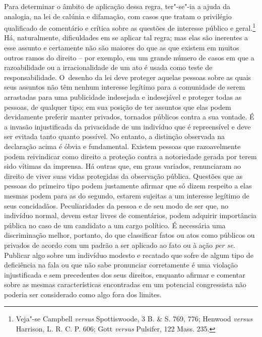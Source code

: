 Para determinar o âmbito de aplicação dessa regra, ter"-se"-ia a ajuda da
analogia, na lei de calúnia e difamação, com casos que tratam o
privilégio qualificado de comentário e crítica sobre as questões de
interesse público e geral.\footnote{Veja"-se Campbell \emph{versus}
  Spottiswoode, 3 B. \& S. 769, 776; Henwood \emph{versus} Harrison, L.
  R. C. P. 606; Gott \emph{versus} Pulsifer, 122 Mass. 235.} Há,
naturalmente, dificuldades em se aplicar tal regra; mas elas são
inerentes a esse assunto e certamente não são maiores do que as que
existem em muitos outros ramos do direito -- por exemplo, em um grande
número de casos em que a razoabilidade ou a irracionalidade de um ato é
usada como teste de responsabilidade. O~desenho da lei deve proteger
aquelas pessoas sobre as quais seus assuntos não têm nenhum interesse
legítimo para a comunidade de serem arrastadas para uma publicidade
indesejada e indesejável e proteger todas as pessoas, de qualquer tipo;
em sua posição de ter assuntos que elas podem devidamente preferir
manter privados, tornados públicos contra a sua vontade. É a invasão
injustificada da privacidade de um indivíduo que é repreensível e deve
ser evitada tanto quanto possível. No entanto, a distinção observada na
declaração acima é óbvia e fundamental. Existem pessoas que
razoavelmente podem reivindicar como direito a proteção contra a
notoriedade gerada por terem sido vítimas da imprensa. Há outras que, em
graus variados, renunciaram ao direito de viver suas vidas protegidas da
observação pública. Questões que as pessoas do primeiro tipo podem
justamente afirmar que só dizem respeito a elas mesmas podem para as do
segundo, estarem sujeitas a um interesse legítimo de seus concidadãos.
Peculiaridades da pessoa e de seu modo de ser que, no indivíduo normal,
devem estar livres de comentários, podem adquirir importância pública no
caso de um candidato a um cargo político. É necessária uma discriminação
melhor, portanto, do que classificar fatos ou atos como públicos ou
privados de acordo com um padrão a ser aplicado ao fato ou à ação
\emph{per se}. Publicar algo sobre um indivíduo modesto e recatado que
sofre de algum tipo de deficiência na fala ou que não sabe pronunciar
corretamente é uma violação injustificada e sem precedentes dos seus
direitos, enquanto afirmar e comentar sobre as mesmas características
encontradas em um potencial congressista não poderia ser considerado
como algo fora dos limites.

